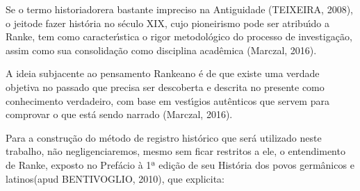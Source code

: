 \documentclass[
12pt,		%
openright,	%
twoside,  %
a4paper,			%
chapter=TITLE,		%
english,			%
french,				%
spanish,			%
brazil				%
]{USPSC-classe/USPSC}
\begin{document}
Se o termo \textquotedbl historiador\textquotedbl  era bastante impreciso na Antiguidade (TEIXEIRA, 2008), o \textquotedbl jeito\textquotedbl  de fazer hist\'oria no s\'eculo XIX, cujo pioneirismo pode ser atribu\'{\i}do a Ranke, tem como caracter\'{\i}stica \textquotedbl o rigor metodol\'ogico do processo de investiga\c{c}\~ao\textquotedbl , assim como sua consolida\c{c}\~ao como disciplina acad\^emica (Marczal, 2016).

















A ideia subjacente ao pensamento Rankeano \'e de que existe uma verdade objetiva no passado que precisa ser descoberta e descrita no presente como \textquotedbl conhecimento verdadeiro\textquotedbl , com base em vest\'{\i}gios aut\^enticos que servem para comprovar o que est\'a sendo narrado (Marczal, 2016).

















Para a constru\c{c}\~ao do m\'etodo de registro hist\'orico que ser\'a utilizado neste trabalho, n\~ao negligenciaremos, mesmo sem ficar restritos a ele, o entendimento de Ranke, exposto no Pref\'acio \`a 1ª edi\c{c}\~ao de seu \textquotedbl Hist\'oria dos povos germ\^anicos e latinos\textquotedbl   (apud BENTIVOGLIO, 2010), que explicita:


















\noindent\begin{center}\mbox{\centering{}}\end{center}
\end{document}
